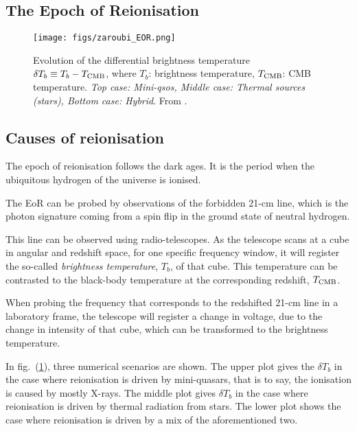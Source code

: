 \documentclass[noxcolor]{article}
\begin{document}
\begin{frame}
    \section{The Epoch of Reionisation}
\end{frame}
\begin{frame}

    \begin{figure}[htb]
        \centering
        \texttt{[image: figs/zaroubi\_EOR.png]}
        \caption{ Evolution of the differential brightness temperature $\delta T_b \equiv T_b - T_{\rm CMB}$, where $T_b$: brightness temperature, $T_{\rm CMB}$: CMB temperature. {\em Top case: Mini-qsos, Middle case: Thermal sources (stars), Bottom case: Hybrid}. From . }
        \label{fig:1_EOR}
    \end{figure}

\end{frame}

\subsection{Causes of reionisation}
The epoch of reionisation follows the dark ages. It is the period when the ubiquitous hydrogen of the universe is ionised.

The EoR can be probed by observations of the forbidden 21-cm line, which is the photon signature coming from a spin flip in the ground state of neutral hydrogen. 

This line can be observed using radio-telescopes. As the telescope scans at a cube in angular and redshift space, for one specific frequency window, it will register the so-called \textit{brightness temperature}, $T_b$, of that cube. This temperature can be contrasted to the black-body temperature at the corresponding redshift, $T_{\rm CMB}$. 

When probing the frequency that corresponds to the redshifted 21-cm line in a laboratory frame, the telescope will register a change in voltage, due to the change in intensity of that cube, which can be transformed to the brightness temperature. 

In fig.~(\ref{fig:1_EOR}), three numerical scenarios are shown. The upper plot gives the $\delta T_b$ in the case where reionisation is driven by mini-quasars, that is to say, the ionisation is caused by mostly X-rays. The middle plot gives $\delta T_b$ in the case where reionisation is driven by thermal radiation from stars. The lower plot shows the case where reionisation is driven by a mix of the aforementioned two.
\end{document}
